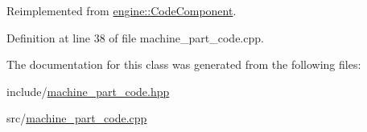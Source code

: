 Reimplemented from \hyperlink{classengine_1_1_code_component_af76ba17f9f87216418081d1e2c7c3a22}{engine\+::\+Code\+Component}.



Definition at line 38 of file machine\+\_\+part\+\_\+code.\+cpp.



The documentation for this class was generated from the following files\+:\begin{DoxyCompactItemize}
\item 
include/\hyperlink{machine__part__code_8hpp}{machine\+\_\+part\+\_\+code.\+hpp}\item 
src/\hyperlink{machine__part__code_8cpp}{machine\+\_\+part\+\_\+code.\+cpp}\end{DoxyCompactItemize}

